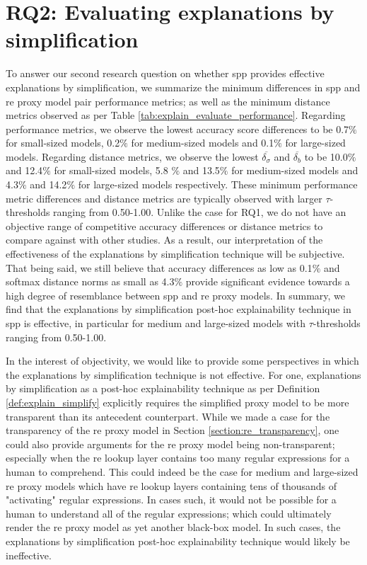\section{RQ2: Evaluating explanations by simplification}

To answer our second research question on whether \ac{spp} provides effective
explanations by simplification, we summarize the minimum differences in \ac{spp}
and \ac{re} proxy model pair performance metrics; as well as the minimum
distance metrics observed as per Table \ref{tab:explain_evaluate_performance}.
Regarding performance metrics, we observe the lowest accuracy score differences
to be 0.7$\%$ for small-sized models, 0.2$\%$ for medium-sized models and 0.1$\%$ for
large-sized models. Regarding distance metrics, we observe the lowest
$\overline{\delta_{\sigma}}$ and $\overline{\delta_{b}}$ to be 10.0$\%$ and
12.4$\%$ for small-sized models, 5.8 $\%$ and 13.5$\%$ for medium-sized models
and 4.3$\%$ and 14.2$\%$ for large-sized models respectively. These minimum
performance metric differences and distance metrics are typically observed with
larger $\tau$-thresholds ranging from 0.50-1.00. Unlike the case for RQ1, we do
not have an objective range of competitive accuracy differences or distance
metrics to compare against with other studies. As a result, our interpretation
of the effectiveness of the explanations by simplification technique will be
subjective. That being said, we still believe that accuracy differences as low
as 0.1$\%$ and softmax distance norms as small as 4.3$\%$ provide significant
evidence towards a high degree of resemblance between \ac{spp} and \ac{re} proxy
models. In summary, we find that the explanations by simplification post-hoc
explainability technique in \ac{spp} is effective, in particular for medium and
large-sized models with $\tau$-thresholds ranging from 0.50-1.00.

In the interest of objectivity, we would like to provide some perspectives in
which the explanations by simplification technique is not effective. For one,
explanations by simplification as a post-hoc explainability technique as per
Definition \ref{def:explain_simplify} explicitly requires the simplified proxy
model to be more transparent than its antecedent counterpart. While we made a
case for the transparency of the \ac{re} proxy model in Section
\ref{section:re_transparency}, one could also provide arguments for the \ac{re} proxy
model being non-transparent; especially when the \ac{re} lookup layer contains too
many regular expressions for a human to comprehend. This could indeed be the
case for medium and large-sized \ac{re} proxy models which have \ac{re} lookup layers
containing tens of thousands of "activating" regular expressions. In cases such,
it would not be possible for a human to understand all of the regular
expressions; which could ultimately render the \ac{re} proxy model as yet another
black-box model. In such cases, the explanations by simplification post-hoc
explainability technique would likely be ineffective.

